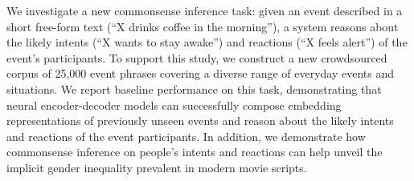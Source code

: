 We investigate a new commonsense inference task: given an event described in a short free-form text ({``X drinks coffee in the morning''}), a system reasons about the likely intents ({``X wants to stay awake''}) and reactions ({``X feels alert''}) of the event's participants. To support this study, we construct a new crowdsourced corpus of 25,000 event phrases covering a diverse range of everyday events and situations. We report baseline performance on this task, demonstrating that neural encoder-decoder models can successfully compose embedding representations of previously unseen events and reason about the likely intents and reactions of the event participants. In addition, we demonstrate how commonsense inference on people's intents and reactions can help unveil the implicit gender inequality prevalent in modern movie scripts.
